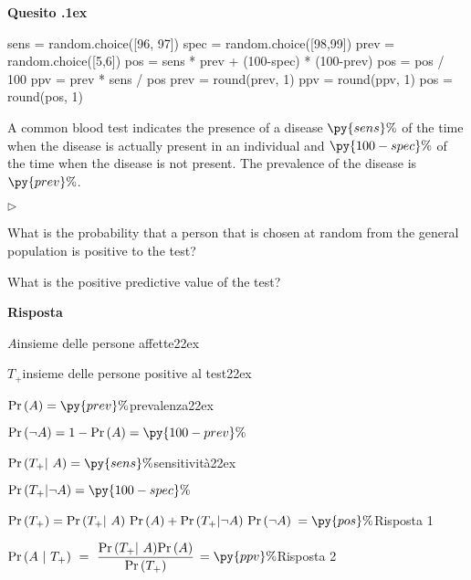 \documentclass[11pt,twoside,a4paper]{article}
\newcommand{\mylabel}[1]{#1\hfill}
\renewenvironment{itemize}
  {\begin{list}{$\triangleright$}{%
   \setlength{\parskip}{0mm}
   \setlength{\topsep}{.4\baselineskip}
   \setlength{\rightmargin}{0mm}
   \setlength{\listparindent}{0mm}
   \setlength{\itemindent}{0mm}
   \setlength{\labelwidth}{2ex}
   \setlength{\itemsep}{.4\baselineskip}
   \setlength{\parsep}{0mm}
   \setlength{\partopsep}{0mm}
   \setlength{\labelsep}{1ex}
   \setlength{\leftmargin}{\labelwidth+\labelsep}
   \let\makelabel\mylabel}}{%
   \end{list}\vspace*{-1.3mm}}
\def\Pr{{\rm Pr\,}}
\newcounter{quesito}
\newenvironment{question}{\bigskip\addtocounter{quesito}{1}\par\textbf{Quesito \thequesito.\kern1ex}}{\vspace{\parskip}}
\newenvironment{answer}{\par\textbf{Risposta\quad}}{\vspace{\parskip}}
\begin{document}
\begin{question}
\begin{pycode}
sens = random.choice([96, 97])
spec = random.choice([98,99])
prev = random.choice([5,6])
pos =  sens * prev + (100-spec) * (100-prev)
pos = pos / 100
ppv =  prev * sens  / pos
prev = round(prev, 1)
ppv = round(ppv, 1)
pos = round(pos, 1)
\end{pycode}
A common blood test indicates the presence of a disease $\py{sens}\%$ of the time when the disease is actually present in an individual and $\py{100-spec}\%$ of the time when the disease is not present. The prevalence of the disease is $\py{prev}\%$.
\begin{itemize}
\item[1.] What is the probability that a person that is chosen at random from the general population is positive to the test?
\item[2.] What is the positive predictive value of the test? 
\end{itemize}
\begin{answer}

$A$\hfill insieme delle persone affette\kern22ex

$T_+$\hfill insieme delle persone positive al test\kern22ex

$\Pr(A)=\py{prev}\%$\hfill prevalenza\kern22ex

$\Pr(\neg A)=1-\Pr(A)=\py{100-prev}\%$

$\Pr(T_+|~ A)=\py{sens}\%$\hfill sensitività\kern22ex

$\Pr(T_+|\neg A)=\py{100-spec}\%$

$\Pr(T_+)=\Pr(T_+|~A)\ \Pr(A) + \Pr(T_+|\neg A)\ \Pr(\neg A)$ {\color{blue} $=\py{pos}\%$\hfill Risposta 1}

$\displaystyle\Pr(A ~|~T_+)\ =\ \frac{\Pr(T_+|~A)\Pr(A)}{\Pr(T_+)}$ {\color{blue} $=\py{ppv}\%$\hfill Risposta 2}

\end{answer}
\end{question}
\end{document}
